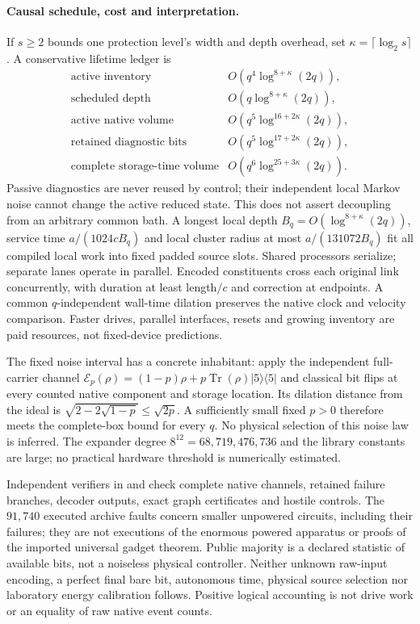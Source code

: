 \paragraph{Causal schedule, cost and interpretation.}
If $s\ge2$ bounds one protection level's width and depth overhead, set
$\kappa=\lceil\log_2s\rceil$. A conservative lifetime ledger is
\[
 \begin{array}{ll}
 \text{active inventory}&O(q^4\log^{8+\kappa}(2q)),\\
 \text{scheduled depth}&O(q\log^{8+\kappa}(2q)),\\
 \text{active native volume}&O(q^5\log^{16+2\kappa}(2q)),\\
 \text{retained diagnostic bits}&O(q^5\log^{17+2\kappa}(2q)),\\
 \text{complete storage-time volume}&O(q^6\log^{25+3\kappa}(2q)).
 \end{array}
\]
Passive diagnostics are never reused by control; their independent local
Markov noise cannot change the active reduced state. This does not assert
decoupling from an arbitrary common bath. A longest local depth
$B_q=O(\log^{8+\kappa}(2q))$, service time $a/(1024cB_q)$ and local
cluster radius at most $a/(131072B_q)$ fit all compiled local work into
fixed padded source slots. Shared processors serialize; separate lanes
operate in parallel. Encoded constituents cross each original link
concurrently, with duration at least length$/c$ and correction at endpoints.
A common $q$-independent wall-time dilation preserves the native clock and
velocity comparison. Faster drives, parallel interfaces, resets and growing
inventory are paid resources, not fixed-device predictions.

The fixed noise interval has a concrete inhabitant: apply the independent
full-carrier channel
$\mathcal E_p(\rho)=(1-p)\rho+p\operatorname{Tr}(\rho)|5\rangle\langle5|$
and classical bit flips at every counted native component and storage
location. Its dilation distance from the ideal is
$\sqrt{2-2\sqrt{1-p}}\le\sqrt{2p}$. A sufficiently small fixed $p>0$
therefore meets the complete-box bound for every $q$.
No physical selection of this noise law is inferred. The expander degree
$8^{12}=68{,}719{,}476{,}736$ and the library constants are large; no
practical hardware threshold is numerically estimated.

Independent verifiers in  and
 check complete native channels, retained
failure branches, decoder outputs, exact graph certificates and hostile
controls. The $91{,}740$ executed archive faults concern smaller unpowered
circuits, including their failures; they are not executions of the enormous
powered apparatus or proofs of the imported universal gadget theorem.
Public majority is a declared statistic of available bits, not a noiseless
physical controller. Neither unknown raw-input encoding, a perfect final
bare bit, autonomous time, physical source selection nor laboratory energy
calibration follows. Positive logical accounting is not drive work or an
equality of raw native event counts.
